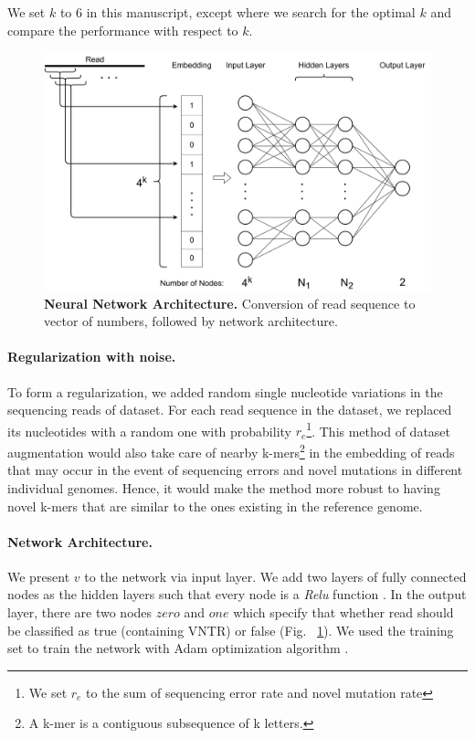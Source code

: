 We set $k$ to 6 in this manuscript, except where we search for the optimal $k$ and compare the performance with respect to $k$.

\begin{figure}[ht]
\begin{center}
\centerline{\includegraphics[width=\columnwidth]{fig/NeuralNetworkArch.png}}
  \caption{\footnotesize {\bf Neural Network Architecture.} Conversion of read sequence to vector of numbers, followed by network architecture.}
  \label{fig:neural_network}
\end{center}
\vspace{-0.3in}
\end{figure}

\paragraph{Regularization with noise.}
To form a regularization, we added random single nucleotide variations in the sequencing reads of dataset. For each read sequence in the dataset, we replaced its nucleotides with a random one with probability $r_e$\footnote{We set $r_e$ to the sum of sequencing error rate and novel mutation rate}. This method of dataset augmentation would also take care of nearby k-mers\footnote{A k-mer is a contiguous subsequence of k letters.} in the embedding of reads that may occur in the event of sequencing errors and novel mutations in different individual genomes. Hence, it would make the method more robust to having novel k-mers that are similar to the ones existing in the reference genome.

\paragraph{Network Architecture.}
We present $v$ to the network via input layer.
We add two layers of fully connected nodes as the hidden layers such that every node is a \emph{Relu} function \cite{Nair2010}. In the output layer, there are two nodes $zero$ and $one$ which specify that whether read should be classified as true (containing VNTR) or false (Fig. ~\ref{fig:neural_network}). We used the training set to train the network with Adam optimization algorithm \cite{Kingma2014}.


